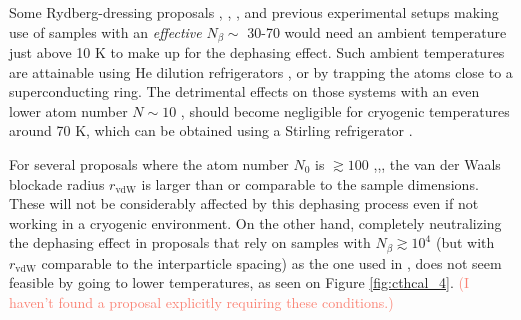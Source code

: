 \documentclass[10pt,twocolumn]{article}
\begin{document}
Some Rydberg-dressing proposals \cite{pupillo2010}, \cite{Glaetzle2012}, \cite{Bouchoule2002}, \cite{Glaetzle2014} and previous experimental setups \cite{Bloch} making use of samples with an \textit{effective} $N_{\beta}\sim$ 30-70 would need an ambient temperature just above 10 K to make up for the dephasing effect. Such ambient temperatures are attainable using He dilution refrigerators \cite{CryoHeDiluRef1}, or by trapping the atoms close to a superconducting ring\cite{CryoSupercRing1}. The detrimental effects on those systems with an even lower atom number $N\sim 10$ \cite{vanBijnen2015}, \cite{Lee2013a} should become negligible for cryogenic temperatures around 70 K, which can be obtained using a Stirling refrigerator \cite{CryoStirlingRefrig}.

For several proposals where the atom number $N_0$ is $\gtrsim 100$ \cite{honer10a},\cite{maucher2011},\cite{Davis2016}, the van der Waals blockade radius $r_{\text{vdW}}$ is larger than or comparable to the sample dimensions. These will not be considerably affected by this dephasing process even if not working in a cryogenic environment. On the other hand, completely neutralizing the dephasing effect in proposals that rely on samples with $N_\beta \gtrsim 10^4$ (but with $r_{\text{vdW}}$ comparable to the interparticle spacing) as the one used in \cite{AB}, does not seem feasible by going to lower temperatures, as seen on Figure \ref{fig:cthcal_4}. \textcolor{Salmon}{(I haven't found a proposal explicitly requiring these conditions.)}
\end{document}
